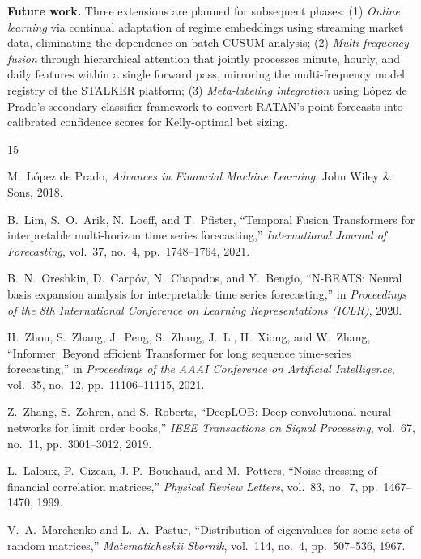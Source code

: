 \documentclass[conference]{IEEEtran}
\begin{document}
\textbf{Future work.} Three extensions are planned for subsequent phases: (1) \textit{Online learning} via continual adaptation of regime embeddings using streaming market data, eliminating the dependence on batch CUSUM analysis; (2) \textit{Multi-frequency fusion} through hierarchical attention that jointly processes minute, hourly, and daily features within a single forward pass, mirroring the multi-frequency model registry of the STALKER platform; (3) \textit{Meta-labeling integration} using L\'{o}pez de Prado's secondary classifier framework to convert RATAN's point forecasts into calibrated confidence scores for Kelly-optimal bet sizing.

\begin{thebibliography}{15}

 M.~L\'{o}pez de Prado, \emph{Advances in Financial Machine Learning}, John Wiley \& Sons, 2018.

 B.~Lim, S.~O.~Arik, N.~Loeff, and T.~Pfister, ``Temporal Fusion Transformers for interpretable multi-horizon time series forecasting,'' \emph{International Journal of Forecasting}, vol.~37, no.~4, pp.~1748--1764, 2021.

 B.~N.~Oreshkin, D.~Carp\'{o}v, N.~Chapados, and Y.~Bengio, ``N-BEATS: Neural basis expansion analysis for interpretable time series forecasting,'' in \emph{Proceedings of the 8th International Conference on Learning Representations (ICLR)}, 2020.

 H.~Zhou, S.~Zhang, J.~Peng, S.~Zhang, J.~Li, H.~Xiong, and W.~Zhang, ``Informer: Beyond efficient Transformer for long sequence time-series forecasting,'' in \emph{Proceedings of the AAAI Conference on Artificial Intelligence}, vol.~35, no.~12, pp.~11106--11115, 2021.

 Z.~Zhang, S.~Zohren, and S.~Roberts, ``DeepLOB: Deep convolutional neural networks for limit order books,'' \emph{IEEE Transactions on Signal Processing}, vol.~67, no.~11, pp.~3001--3012, 2019.

 L.~Laloux, P.~Cizeau, J.-P.~Bouchaud, and M.~Potters, ``Noise dressing of financial correlation matrices,'' \emph{Physical Review Letters}, vol.~83, no.~7, pp.~1467--1470, 1999.

 V.~A.~Marchenko and L.~A.~Pastur, ``Distribution of eigenvalues for some sets of random matrices,'' \emph{Matematicheskii Sbornik}, vol.~114, no.~4, pp.~507--536, 1967.


\end{thebibliography}
\end{document}

